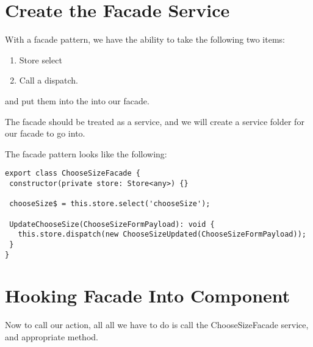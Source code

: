 \section{ Create the Facade Service  }

With a facade pattern, we have the ability to take the following two items:
\begin{enumerate}
  \item Store select
  \item Call a dispatch.
\end{enumerate}

and put them into the into our facade.

The facade should be treated as a service, and we will create a service folder
for our facade to go into.

The facade pattern looks like the following:
\begin{lstlisting}
export class ChooseSizeFacade {
 constructor(private store: Store<any>) {}

 chooseSize$ = this.store.select('chooseSize');

 UpdateChooseSize(ChooseSizeFormPayload): void {
   this.store.dispatch(new ChooseSizeUpdated(ChooseSizeFormPayload));
 }
}
\end{lstlisting}

\section{ Hooking Facade Into Component }
Now to call our action, all all we have to do is call the ChooseSizeFacade
service, and appropriate method.

